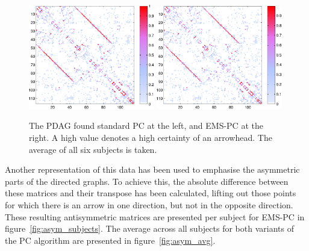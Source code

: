 \documentclass[a4paper, 10pt, english, onecolumn]{article}
\begin{document}
\begin{figure}[h!]
  \centering
  \includegraphics[width=0.49\textwidth]{images/new/PDAG_avg_mod-crop}
  \includegraphics[width=0.49\textwidth]{images/new/PDAG_avg_expl-crop}
  \caption{The PDAG found standard PC at the left, and EMS-PC at the right. A high value denotes a high certainty of an arrowhead. The average of all six subjects is taken.}
  \label{fig:pdag_avg}
\end{figure}

Another representation of this data has been used to emphasise the asymmetric parts of the directed graphs.
To achieve this, the absolute difference between these matrices and their transpose has been calculated, lifting out those points for which there is an arrow in one direction, but not in the opposite direction.
These resulting antisymmetric matrices are presented per subject for EMS-PC in figure~\ref{fig:asym_subjects}. The average across all subjects for both variants of the PC algorithm are presented in figure~\ref{fig:asym_avg}.
\end{document}
